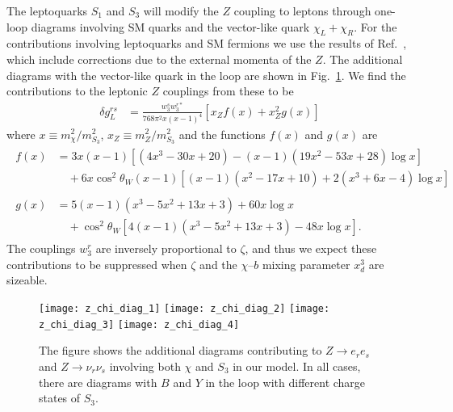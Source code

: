 The leptoquarks $S_{1}$ and $S_{3}$ will modify the $Z$ coupling to leptons
through one-loop diagrams involving SM quarks and the vector-like quark
$\chi_{L} + \chi_{R}$. For the contributions involving leptoquarks and SM
fermions we use the results of Ref.~\cite{Arnan:2019olv}, which include
corrections due to the external momenta of the $Z$. The additional diagrams with
the vector-like quark in the loop are shown in Fig.~\ref{fig:ch4-Zchidiags}. We
find the contributions to the leptonic $Z$ couplings from these to be
\begin{align}
    \delta g_{L}^{r s} &= \frac{w_{3}^{s} w_{3}^{r*}}{768 \pi^2 x (x - 1)^4} [x_Z f(x) + x_Z^2 g(x)]
\end{align}
where $x \equiv m_\chi^2 / m_{S_{3}}^2$, $x_Z \equiv m_Z^2 / m_{S_{3}}^2$ and
the functions $f(x)$ and $g(x)$ are
\begin{align}
  \begin{split}
    f(x) &= 3 x (x - 1) \left[ (4x^3 - 30x + 20) - (x - 1) (19x^2 - 53x + 28) \log x \right]\\ &\quad + 6x\cos^2 \theta_W(x-1) \left[ (x-1)(x^2 - 17x + 10) + 2(x^3 + 6x - 4) \log x \right]
  \end{split} \\
  \begin{split}
    g(x) &= 5(x-1)(x^3 - 5x^2 + 13x + 3) + 60 x \log x\\ &\quad + \cos^2\theta_W \left[4(x-1)(x^3 - 5x^2 + 13x + 3) - 48 x \log x  \right].
  \end{split}
\end{align}
The couplings $w_{3}^{r}$ are inversely proportional to $\zeta$, and thus we
expect these contributions to be suppressed when $\zeta$ and the $\chi$--$b$
mixing parameter $x_{d}^{3}$ are sizeable.

\begin{figure}[t]
  \centering
  \texttt{[image: z\_chi\_diag\_1]}
  \texttt{[image: z\_chi\_diag\_2]}
  \texttt{[image: z\_chi\_diag\_3]}
  \texttt{[image: z\_chi\_diag\_4]}
  \caption[The figure shows the additional diagrams contributing to
  $Z \to e_{r} e_{s}$ and $Z \to \nu_{r} \nu_{s}$ involving both $\chi$ and
  $S_{3}$ in our model.]{The figure shows the additional diagrams contributing
    to $Z \to e_{r} e_{s}$ and $Z \to \nu_{r} \nu_{s}$ involving both $\chi$ and
    $S_{3}$ in our model. In all cases, there are diagrams with $B$ and $Y$ in
    the loop with different charge states of $S_{3}$.}
  \label{fig:ch4-Zchidiags}
\end{figure}

